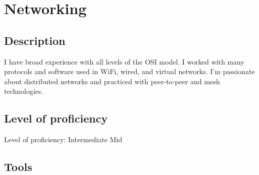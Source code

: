 \section{Networking}

\subsection{Description}

I have broad experience with all levels of the OSI model.
I worked with many protocols and software used in WiFi, wired, and virtual networks.
I'm passionate about distributed networks and practiced with peer-to-peer and mesh technologies.

\subsection{Level of proficiency}

Level of proficiency: Intermediate Mid

\subsection{Tools}

